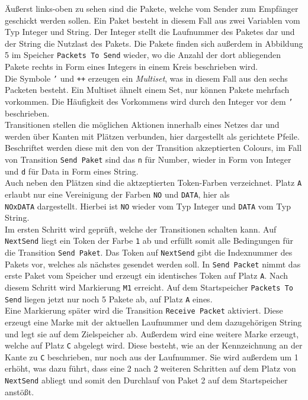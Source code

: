\documentclass[11pt,onecolumn,a4paper,DIV=calc]{scrartcl}
\begin{document}
\newline
Äußerst links-oben zu sehen sind die Pakete, welche vom Sender zum Empfänger geschickt werden sollen. Ein Paket besteht in diesem Fall aus zwei Variablen vom Typ Integer und String. Der Integer stellt die Laufnummer des Paketes dar und der String die Nutzlast des Pakets. Die Pakete finden sich außerdem in Abbildung 5 im Speicher \texttt{Packets To Send} wieder, wo die Anzahl der dort abliegenden Pakete rechts in Form eines Integers in einem Kreis beschrieben wird.\\
Die Symbole \texttt{'} und \texttt{++} erzeugen ein \textit{Multiset}, was in diesem Fall aus den sechs Packeten besteht. Ein Multiset ähnelt einem Set, nur können Pakete mehrfach vorkommen. Die Häufigkeit des Vorkommens wird durch den Integer vor dem \texttt{'} beschrieben.\\
Transitionen stellen die möglichen Aktionen innerhalb eines Netzes dar und werden über Kanten mit Plätzen verbunden, hier dargestellt als gerichtete Pfeile. Beschriftet werden diese mit den von der Transition akzeptierten Colours, im Fall von Transition \texttt{Send Paket} sind das \texttt{n} für Number, wieder in Form von Integer und \texttt{d} für Data in Form eines String.\\
Auch neben den Plätzen sind die aktzeptierten Token-Farben verzeichnet. Platz \texttt{A} erlaubt nur eine Vereinigung der Farben \texttt{NO} und \texttt{DATA}, hier als \\\texttt{NOxDATA} dargestellt. Hierbei ist \texttt{NO} wieder vom Typ Integer und \texttt{DATA} vom Typ String.\\
\newline
Im ersten Schritt wird geprüft, welche der Transitionen schalten kann. Auf \texttt{NextSend} liegt ein Token der Farbe \texttt{1} ab und erfüllt somit alle Bedingungen für die Transition \texttt{Send Paket}. Das Token auf \texttt{NextSend} gibt die Indexnummer des Pakets vor, welches als nächstes gesendet werden soll. 
In \texttt{Send Packet} nimmt das erste Paket vom Speicher und erzeugt ein identisches Token auf Platz \texttt{A}. Nach diesem Schritt wird Markierung \texttt{M1} erreicht. Auf dem Startspeicher \texttt{Packets To Send} liegen jetzt nur noch 5 Pakete ab, auf Platz \texttt{A} eines.\\
Eine Markierung später wird die Transition \texttt{Receive Packet} aktiviert. Diese erzeugt eine Marke mit der aktuellen Laufnummer und dem dazugehörigen String und legt sie auf dem Zielspeicher ab. Außerdem wird eine weitere Marke erzeugt, welche auf Platz \texttt{C} abgelegt wird. Diese besteht, wie an der Kennzeichnung an der Kante zu \texttt{C} beschrieben, nur noch aus der Laufnummer. Sie wird außerdem um 1 erhöht, was dazu führt, dass eine 2 nach 2 weiteren Schritten auf dem Platz von \texttt{NextSend} abliegt und somit den Durchlauf von Paket 2 auf dem Startspeicher anstößt.
\end{document}
